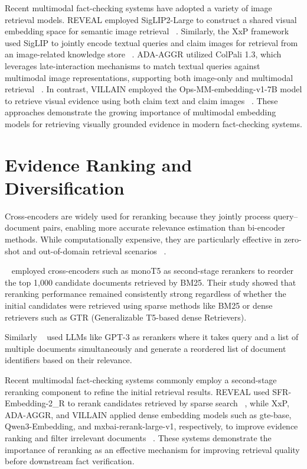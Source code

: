 Recent multimodal fact-checking systems have adopted a variety of image retrieval models. REVEAL employed SigLIP2-Large to construct a shared visual embedding space for semantic image retrieval ~\cite{Tariq2026Mar}. Similarly, the XxP framework used SigLIP to jointly encode textual queries and claim images for retrieval from an image-related knowledge store ~\cite{Tsoneva2026Mar}. ADA-AGGR utilized ColPali 1.3, which leverages late-interaction mechanisms to match textual queries against multimodal image representations, supporting both image-only and multimodal retrieval ~\cite{Upravitelev2026Mar}. In contrast, VILLAIN employed the Ops-MM-embedding-v1-7B model to retrieve visual evidence using both claim text and claim images ~\cite{Jung2026Mar}. These approaches demonstrate the growing importance of multimodal embedding models for retrieving visually grounded evidence in modern fact-checking systems.

\section{Evidence Ranking and Diversification}

Cross-encoders are widely used for reranking because they jointly process query–document pairs, enabling more accurate relevance estimation than bi-encoder methods. While computationally expensive, they are particularly effective in zero-shot and out-of-domain retrieval scenarios ~\cite{Rosa2022Dec}.

~\citet{Rosa2022Dec} employed cross-encoders such as monoT5 as second-stage rerankers to reorder the top 1,000 candidate documents retrieved by BM25. Their study showed that reranking performance remained consistently strong regardless of whether the initial candidates were retrieved using sparse methods like BM25 or dense retrievers such as GTR (Generalizable T5-based dense Retrievers).

Similarly ~\citet{Ma2023May} used LLMs like GPT-3 as rerankers  where it takes query and a list of multiple documents simultaneously and generate a reordered list of document identifiers based on their relevance.

Recent multimodal fact-checking systems commonly employ a second-stage reranking component to refine the initial retrieval results. REVEAL used SFR-Embedding-2\_R to rerank candidates retrieved by sparse search ~\cite{Tariq2026Mar}, while XxP, ADA-AGGR, and VILLAIN applied dense embedding models such as gte-base, Qwen3-Embedding, and mxbai-rerank-large-v1, respectively, to improve evidence ranking and filter irrelevant documents ~\cite{Tsoneva2026Mar,Upravitelev2026Mar,Jung2026Mar}. These systems demonstrate the importance of reranking as an effective mechanism for improving retrieval quality before downstream fact verification.

